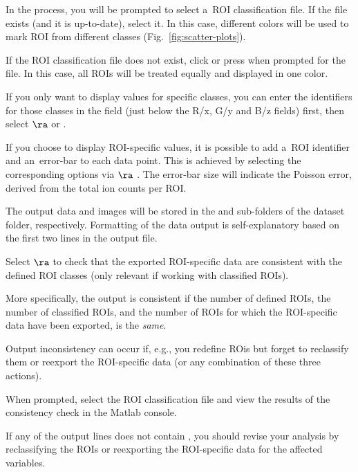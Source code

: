 \nb
\bul In the process, you will be prompted to select a~ROI classification file. If the file exists (and it is up-to-date), select it. In this case, different colors will be used to mark ROI from different classes (Fig.~\ref{fig:scatter-plots}). 

\bul If the ROI classification file does not exist, click  or press  when prompted for the file. In this case, all ROIs will be treated equally and displayed in one color.

\bul If you only want to display values for specific classes, you can enter the identifiers for those classes in the  field (just below the R/x, G/y and B/z fields) first, then select  $\ra$  or .

\bul If you choose to display ROI-specific values, it is possible to add a~ROI identifier and an~error-bar to each data point. This is achieved by selecting the corresponding options via  $\ra$ . The error-bar size will indicate the Poisson error, derived from the total ion counts per ROI.

\bul The output data and images will be stored in the  and  sub-folders of the dataset folder, respectively. Formatting of the data output is self-explanatory based on the first two lines in the output file.

\s Select  $\ra$  to check that the exported ROI-specific data are consistent with the defined ROI  classes (only relevant if working with classified ROIs). 

\nb
\bul More specifically, the output is consistent if the number of defined ROIs, the number of classified ROIs, and the number of ROIs for which the ROI-specific data have been exported, is the \emph{same}.

\bul Output inconsistency can occur if, e.g., you redefine ROis but forget to reclassify them or reexport the ROI-specific data (or any combination of these three actions).

\bul When prompted, select the ROI classification file and view the results of the consistency check in the Matlab console. 

\bul If any of the output lines does not contain , you should revise your analysis by reclassifying the ROIs or reexporting the ROI-specific data for the affected variables.


